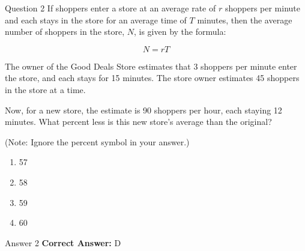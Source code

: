 \documentclass{beamer}
\begin{document}
\begin{frame}{Question 2}
\small
If shoppers enter a store at an average rate of \(r\) shoppers per minute and each stays in the store for an average time of \(T\) minutes, then the average number of shoppers in the store, \(N\), is given by the formula:

\[
N = rT
\]

The owner of the Good Deals Store estimates that 3 shoppers per minute enter the store, and each stays for 15 minutes. The store owner estimates 45 shoppers in the store at a time.

Now, for a new store, the estimate is 90 shoppers per hour, each staying 12 minutes. What percent less is this new store's average than the original?

(Note: Ignore the percent symbol in your answer.)
\vspace{0.35cm}
\begin{enumerate}
    \item[A.] 57
    \item[B.] 58
    \item[C.] 59
    \item[D.] 60
\end{enumerate}
\end{frame}
\begin{frame}{Answer 2}
\small
\textbf{Correct Answer:} D
\end{frame}
\end{document}

